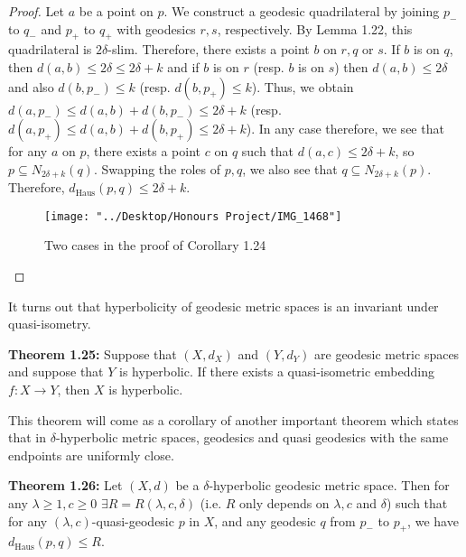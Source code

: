 \documentclass[12pt]{article}
\newcommand{\vs}{\vskip10pt}
\begin{document}
	\begin{proof}
		
		Let $a$ be a point on $p$. We construct a geodesic quadrilateral by joining $p_-$ to $q_-$ and $p_+$ to $q_+$ with geodesics $r,s$, respectively. By Lemma 1.22, this quadrilateral is $2 \delta$-slim. Therefore, there exists a point $b$ on $r,q$ or $s$. If $b$ is on $q$, then $d(a,b) \leq 2\delta \leq 2 \delta + k$ and if $b$ is on $r$ (resp. $b$ is on $s$) then $d(a,b) \leq 2\delta$ and also $d(b, p_-) \leq k$ (resp. $d(b, p_+) \leq k$). Thus, we obtain $d(a, p_-) \leq d(a,b) + d(b, p_-) \leq 2\delta + k$ (resp. $d(a, p_+) \leq d(a,b) + d(b, p_+) \leq 2\delta + k$). In any case therefore, we see that for any $a$ on $p$, there exists a point $c$ on $q$ such that $d(a,c) \leq 2 \delta + k$, so $p \subseteq N_{2 \delta + k} (q)$. Swapping the roles of $p,q$, we also see that $q \subseteq N_{2 \delta + k} (p)$. Therefore, $d_{\text{Haus}}(p,q) \leq 2 \delta + k$.
		
		\begin{figure} [H]
			\centering
			\texttt{[image: "../Desktop/Honours Project/IMG\_1468"]}
			\caption{Two cases in the proof of Corollary 1.24}
			\label{fig:img1468}
		\end{figure}
		
	\end{proof}
	
	It turns out that hyperbolicity of geodesic metric spaces is an invariant under quasi-isometry. 
	
	\vs 
	
	\textbf{Theorem 1.25: } Suppose that $(X,d_X)$ and $(Y, d_Y)$ are geodesic metric spaces and suppose that $Y$ is hyperbolic. If there exists a quasi-isometric embedding $f : X \rightarrow Y$, then $X$ is hyperbolic. 
	
	\vs 
	
	This theorem will come as a corollary of another important theorem which states that in $\delta$-hyperbolic metric spaces, geodesics and quasi geodesics with the same endpoints are uniformly close. 
	
	\vs 
	
	\textbf{Theorem 1.26: } Let $(X,d)$ be a $\delta$-hyperbolic geodesic metric space. Then for any $\lambda \geq 1, c \geq 0$ $\exists R = R(\lambda, c, \delta)$ (i.e. $R$ only depends on $\lambda, c$ and $\delta$) such that for any $(\lambda, c)$-quasi-geodesic $p$ in $X$, and any geodesic $q$ from $p_-$ to $p_+$, we have $d_{\text{Haus}}(p,q) \leq R$. 
	
\end{document}
